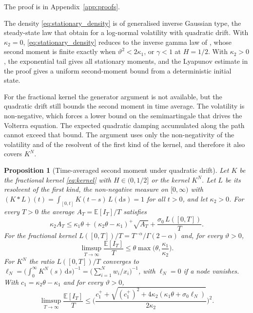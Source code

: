 \documentclass{rQUF2e}
\theoremstyle{plain}
\newtheorem{proposition}[theorem]{Proposition}
\theoremstyle{definition}
\theoremstyle{remark}
\newcommand{\D}{\mathrm{d}}
\newcommand{\E}{\mathbb{E}}
\begin{document}
The proof is in Appendix~\ref{app:proofs}.

The density \eqref{eq:stationary_density} is of generalised inverse Gaussian type, the steady-state law that \citet{CarrWillems2019} obtain for a log-normal volatility with quadratic drift.
With $\kappa_2=0$, \eqref{eq:stationary_density} reduces to the inverse gamma law of \citet{SeppRakhmonov2023}, whose second moment is finite exactly when $\vartheta^2<2\kappa_1$, or $\gamma<1$ at $H=1/2$. With $\kappa_2>0$, the exponential tail gives all stationary moments, and the Lyapunov estimate in the proof gives a uniform second-moment bound from a deterministic initial state.

For the fractional kernel the generator argument is not available, but the quadratic drift still bounds the second moment in time average. The volatility is non-negative, which forces a lower bound on the semimartingale that drives the Volterra equation. The expected quadratic damping accumulated along the path cannot exceed that bound. The argument uses only the non-negativity of the volatility and of the resolvent of the first kind of the kernel, and therefore it also covers $K^N$.

\begin{proposition}[Time-averaged second moment under quadratic drift]\label{prop:cesaro}
Let $K$ be the fractional kernel \eqref{eq:kernel} with $H\in(0,1/2]$ or the kernel $K^N$. Let $L$ be its resolvent of the first kind, the non-negative measure on $[0,\infty)$ with $(K*L)(t)=\int_{[0,t]}K(t-s)\,L(\D s)=1$ for all $t>0$, and let $\kappa_2>0$. For every $T>0$ the average $A_T=\E[I_T]/T$ satisfies
\begin{equation}\label{eq:cesaro}
\kappa_2A_T\le\kappa_1\theta+(\kappa_2\theta-\kappa_1)^+\sqrt{A_T}+\frac{\sigma_0\,L([0,T])}{T} .
\end{equation}
For the fractional kernel $L([0,T])/T=T^{-\alpha}/\Gamma(2-\alpha)$ and, for every $\vartheta>0$,
\begin{equation}\label{eq:cesaro_limit}
\limsup_{T\to\infty}\frac{\E[I_T]}{T}\le\theta\max\Big(\theta,\frac{\kappa_1}{\kappa_2}\Big) .
\end{equation}
For $K^N$ the ratio $L([0,T])/T$ converges to $\ell_N=\big(\int_0^\infty K^N(s)\,\D s\big)^{-1}=\big(\sum_{i=1}^Nw_i/x_i\big)^{-1}$, with $\ell_N=0$ if a node vanishes. With $c_1=\kappa_2\theta-\kappa_1$ and for every $\vartheta>0$,
\begin{equation}\label{eq:cesaro_limit_N}
\limsup_{T\to\infty}\frac{\E[I_T]}{T}\le\bigg(\frac{c_1^++\sqrt{(c_1^+)^2+4\kappa_2(\kappa_1\theta+\sigma_0\ell_N)}}{2\kappa_2}\bigg)^{2} .
\end{equation}
\end{proposition}
\end{document}
